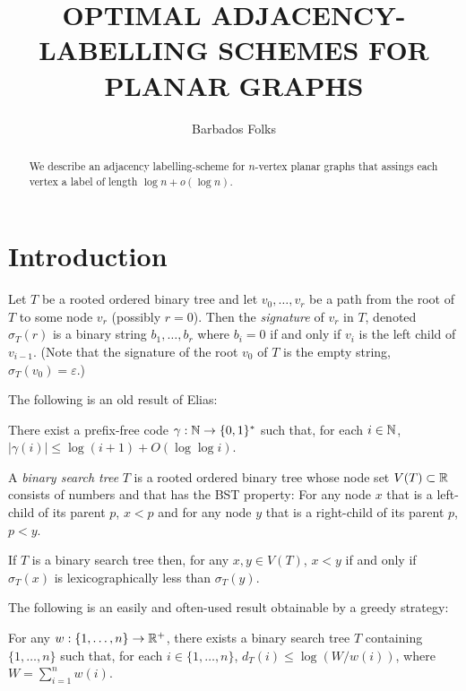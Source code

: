 \documentclass[kpfonts]{patmorin}
\title{\MakeUppercase{Optimal Adjacency-Labelling Schemes for Planar Graphs}}
\author{Barbados Folks}
\begin{document}
\maketitle

\begin{abstract}
  We describe an adjacency labelling-scheme for $n$-vertex planar graphs that assings each vertex a label of length $\log n+o(\log n)$.
\end{abstract}

\section{Introduction}


Let $T$ be a rooted ordered binary tree and let $v_0,\ldots,v_{r}$ be a path from the root of $T$ to some node $v_r$ (possibly $r=0$).  Then the \emph{signature} of $v_r$ in $T$, denoted $\sigma_T(r)$ is a binary string $b_1,\ldots,b_r$ where $b_i=0$ if and only if $v_{i}$ is the left child of $v_{i-1}$.  (Note that the signature of the root $v_0$ of $T$ is the empty string,  $\sigma_T(v_0)=\varepsilon$.)

The following is an old result of Elias:

\begin{lem}
    There exist a prefix-free code $\gamma:\mathbb{N}\to\{0,1\}^*$ such that, for each $i\in\mathbb{N}$, $|\gamma(i)|\le \log(i+1)+O(\log\log i)$.
\end{lem}

A \emph{binary search tree} $T$ is a rooted ordered binary tree whose node set $V(T)\subset\mathbb{R}$ consists of numbers and that has the BST property:  For any node $x$ that is a left-child of its parent $p$, $x<p$ and for any node $y$ that is a right-child of its parent $p$, $p<y$.  

\begin{obs}
  If $T$ is a binary search tree then, for any $x,y\in V(T)$, $x<y$ if and only if $\sigma_T(x)$ is lexicographically less than $\sigma_T(y)$.
\end{obs}


The following is an easily and often-used result obtainable by a greedy strategy:

\begin{lem}
  For any $w:\{1,\ldots,n\}\to\mathbb{R}^+$, there exists a binary search tree $T$ containing $\{1,\ldots,n\}$ such that, for each $i\in\{1,\ldots,n\}$, $d_T(i)\le\log(W/w(i))$, where $W=\sum_{i=1}^n w(i)$.
\end{lem}
\end{document}
